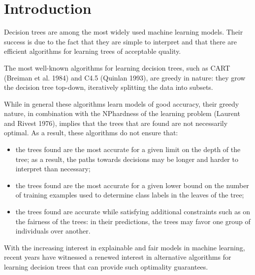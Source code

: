 \section{Introduction}
Decision trees are among the most widely used machine learning models. Their success is due to the fact that they are simple to interpret and that there are efficient algorithms for learning trees of acceptable quality.

The most well-known algorithms for learning decision trees, such as CART (Breiman et al. 1984) and C4.5 (Quinlan 1993), are greedy in nature: they grow the decision tree top-down, iteratively splitting the data into subsets.

While in general these algorithms learn models of good accuracy, their greedy nature, in combination with the NPhardness of the learning problem (Laurent and Rivest 1976), implies that the trees that are found are not necessarily optimal. As a result, these algorithms do not ensure that:

\begin{itemize}
	\item the trees found are the most accurate for a given limit on
	the depth of the tree; as a result, the paths towards decisions may be longer and harder to interpret than necessary;
	\item  the trees found are the most accurate for a given lower
	bound on the number of training examples used to determine class labels in the leaves of the tree;
	\item the trees found are accurate while satisfying additional constraints such as on the fairness of the trees: in their predictions, the trees may favor one group of individuals over another.
\end{itemize}

With the increasing interest in explainable and fair models in machine learning, recent years have witnessed a renewed interest in alternative algorithms for learning decision trees that can provide such optimality guarantees.

